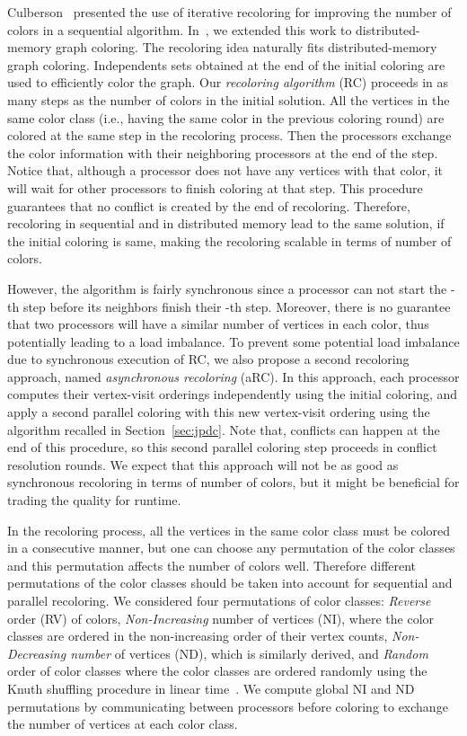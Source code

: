 \documentclass{article}
\begin{document}
Culberson~\cite{Culberson92iteratedgreedy} presented the use of
iterative recoloring for improving the number of colors in a
sequential algorithm. In~\cite{HiPC11}, we extended this work to distributed-memory
graph coloring. The recoloring idea naturally fits distributed-memory
graph coloring.  Independents sets obtained at the end of the initial
coloring are used to efficiently color the graph. Our {\em recoloring algorithm} (RC)
proceeds in as many steps as the number of colors in the initial
solution. All the vertices in the same color class (i.e., having the
same color in the previous coloring round) are colored at the same
step in the recoloring process. Then the processors exchange the color
information with their neighboring processors at the end of the
step. Notice that, although a processor does not have any vertices with
that color, it will wait for other processors to finish coloring at that
step. This procedure guarantees that no conflict is created by the end of
recoloring. Therefore, recoloring in
sequential and in distributed memory lead to the same solution, if
the initial coloring is same, making
the recoloring scalable in terms of number of colors.

However, the algorithm is fairly synchronous since a processor can not
start the -th step before its neighbors finish their -th
step. Moreover, there is no guarantee that two processors will have a
similar number of vertices in each color, thus potentially leading to
a load imbalance. To prevent some potential load imbalance due to
synchronous execution of RC, we also propose a second recoloring
approach, named {\em asynchronous recoloring} (aRC). In this
approach, each processor computes their vertex-visit
orderings independently using the initial coloring, and apply a second parallel
coloring with this new vertex-visit ordering using the algorithm
recalled in Section~\ref{sec:jpdc}. Note that, conflicts can
happen at the end of this procedure, so this second parallel
coloring step proceeds in conflict resolution rounds. We expect
that this approach will not be as good as synchronous recoloring in
terms of number of colors, but it might be beneficial for trading the
quality for runtime.

In the recoloring process, all the vertices in the same
color class must be colored in a consecutive manner, but one can
choose any permutation of the color classes and this permutation affects
the number of colors well. Therefore different permutations
of the color classes should be taken into account for sequential and parallel
recoloring. We considered four permutations of color classes: {\em
  Reverse} order (RV) of colors, {\em Non-Increasing} number of
vertices (NI), where the color classes are ordered in the
non-increasing order of their vertex counts, {\em Non-Decreasing
  number} of vertices (ND), which is similarly derived, and {\em
  Random} order of color classes where the color classes are ordered
randomly using the Knuth shuffling procedure in linear
time~\cite{Culberson92iteratedgreedy}.  We compute global NI and
ND permutations by communicating between processors before coloring to
exchange the number of vertices at each color class.
\end{document}
